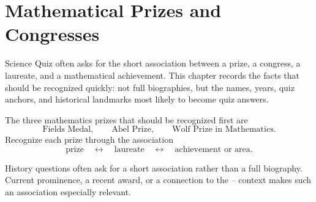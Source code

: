     \chapter{Mathematical Prizes and Congresses}

    Science Quiz often asks for the short association between a prize, a
    congress, a laureate, and a mathematical achievement. This chapter records
    the facts that should be recognized quickly: not full biographies, but the
    names, years, quiz anchors, and historical landmarks most likely to become quiz
    answers.

    \begin{fact}
        The three mathematics prizes that should be recognized first are
        \[
            \text{Fields Medal},\qquad
            \text{Abel Prize},\qquad
            \text{Wolf Prize in Mathematics}.
        \]
        Recognize each prize through the association
        \[
            \text{prize}
            \quad\longleftrightarrow\quad
            \text{laureate}
            \quad\longleftrightarrow\quad
            \text{achievement or area}.
        \]
    \end{fact}

    \begin{strategy}
        History questions often ask for a short association rather than a full
        biography. Current prominence, a recent award, or a connection to the
        \POSTECH--\KAIST{} context makes such an association especially relevant.
    \end{strategy}

    \vspace{1em}


